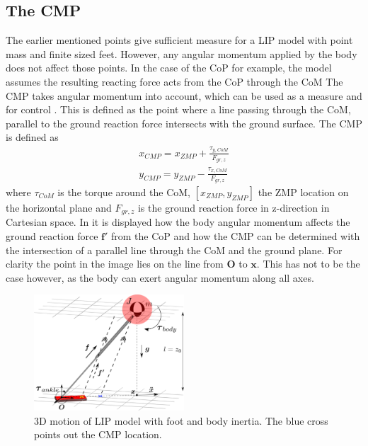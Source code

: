 \subsection{The \ac{CMP}}
The earlier mentioned points give sufficient measure for a \ac{LIP} model with point mass and finite sized feet. However, any angular momentum applied by the body does not affect those points. In the case of the \ac{CoP} for example, the model assumes the resulting reacting force acts from the \ac{CoP} through the \ac{CoM} The \ac{CMP} takes angular momentum into account, which can be used as a measure and for control \cite{popovic2005ground}. This is defined as the point where a line passing through the \ac{CoM}, parallel to the ground reaction force intersects with the ground surface. The \ac{CMP} is defined as
\begin{eqnarray}
x_{CMP} = x_{ZMP} + \frac{\tau_{y,CoM}}{F_{gr,z}}\\
y_{CMP} = y_{ZMP} - \frac{\tau_{x,CoM}}{F_{gr,z}}
\end{eqnarray}
where $\tau_{CoM}$ is the torque around the \ac{CoM}, $[x_{ZMP},y_{ZMP}]$ the \ac{ZMP} location on the horizontal plane and $F_{gr,z}$ is the ground reaction force in z-direction in Cartesian space. In  it is displayed how the body angular momentum affects the ground reaction force $\boldsymbol{f'}$ from the \ac{CoP} and how the \ac{CMP} can be determined with the intersection of a parallel line through the \ac{CoM} and the ground plane. For clarity the point in the image lies on the line from $\boldsymbol{O}$ to $\boldsymbol{x}$. This has not to be the case however, as the body can exert angular momentum along all axes. 
\begin{figure}[h]
\centering
\includegraphics[width=0.5\textwidth]{STYLESTUFF/3DCoMwithfootinertia.png}
\caption{\ac{3D} motion of \ac{LIP} model with foot and body inertia. The blue cross points out the \ac{CMP} location.}
\label{fig:3dlipfootinertia}
\end{figure}
